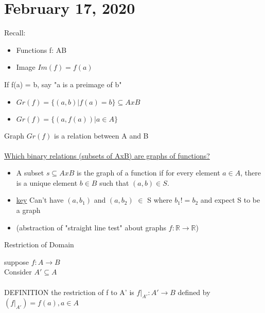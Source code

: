 \documentclass{article}
\begin{document}
\tableofcontents

\section{February 17, 2020}
   
Recall:
\begin{itemize}
  \item Functions f: A\textrightarrow  B
  \item Image $Im(f) = f(a)$
\end{itemize}

\noindent If f(a) = b, say "a is a preimage of b"
\begin{itemize}
  \item $Gr(f) = \{(a,b) | f(a)=b\}\subseteq AxB$
  \item $Gr(f) = \{(a,f(a)) | a \in A\}$
\end{itemize}

\noindent Graph $Gr(f)$ is a relation between A and B\\
\\
\underline{Which binary relations (subsets of AxB) are graphs of functions?}
\begin{itemize}
  \item A subset $s\subseteq AxB$ is the graph of a function if for every element $a \in A$, there is a unique element $b \in B$ such that $(a,b) \in S$.
  \item \underline{key} Can't have $(a, b_1)$ and $(a, b_2)$ $\in$ S where $b_1 != b_2$ and expect S to be a graph
  \item (abstraction of "straight line test" about graphs $f:\mathbb{R}\rightarrow\mathbb{R}$)
\end{itemize}

\noindent Restriction of Domain

\indent suppose $f:A \rightarrow B$\\
\indent Consider $A'\subseteq A$\\ \\
\indent DEFINITION the restriction of f to A' is $f|_{A'}: A' \rightarrow B$ defined by $(f|_{A'})=f(a), a \in A$






\end{document}

